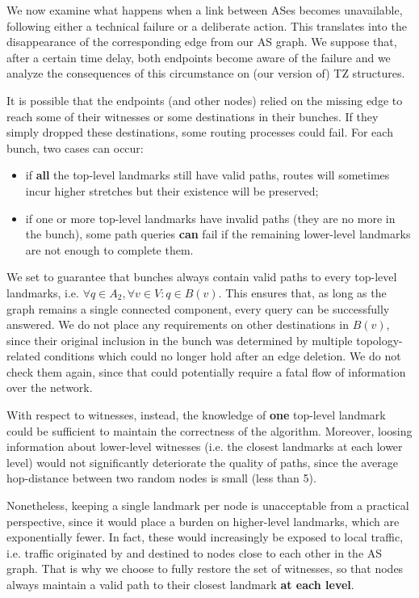 \documentclass[a4paper,11pt,oneside]{report}
\begin{document}
We now examine what happens when a link between ASes becomes unavailable, following either a technical failure or a deliberate action. This translates into the disappearance of the corresponding edge from our AS graph. We suppose that, after a certain time delay, both endpoints become aware of the failure and we analyze the consequences of this circumstance on (our version of) TZ structures.

\bigskip
It is possible that the endpoints (and other nodes) relied on the missing edge to reach some of their witnesses or some destinations in their bunches. If they simply dropped these destinations, some routing processes could fail.
For each bunch, two cases can occur:
\begin{itemize}
\item if \textbf{all} the top-level landmarks still have valid paths, routes will sometimes incur higher stretches but their existence will be preserved;
\item if one or more top-level landmarks have invalid paths (they are no more in the bunch), some path queries \textbf{can} fail if the remaining lower-level landmarks are not enough to complete them.
\end{itemize}
We set to guarantee that bunches always contain valid paths to every top-level landmarks, i.e. $\forall q \in A_2, \forall v \in V:q \in B(v)$. This ensures that, as long as the graph remains a single connected component, every query can be successfully answered. We do not place any requirements on other destinations in $B(v)$, since their original inclusion in the bunch was determined by multiple topology-related conditions which could no longer hold after an edge deletion. We do not check them again, since that could potentially require a fatal flow of information over the network.

\bigskip
With respect to witnesses, instead, the knowledge of \textbf{one} top-level landmark could be sufficient to maintain the correctness of the algorithm. Moreover, loosing information about lower-level witnesses (i.e. the closest landmarks at each lower level) would not significantly deteriorate the quality of paths, since the average hop-distance between two random nodes is small (less than 5).

Nonetheless, keeping a single landmark per node is unacceptable from a practical perspective, since it would place a burden on higher-level landmarks, which are exponentially fewer. In fact, these would increasingly be exposed to local traffic, i.e. traffic originated by and destined to nodes close to each other in the AS graph. That is why we choose to fully restore the set of witnesses, so that nodes always maintain a valid path to their closest landmark \textbf{at each level}.
\end{document}
